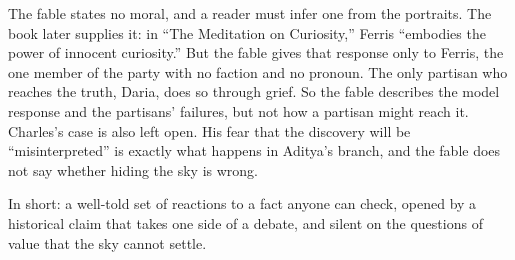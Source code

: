 \begin{afterword}
The fable states no moral, and a reader must infer one from the portraits. The book later supplies it: in ``The Meditation on Curiosity,'' Ferris ``embodies the power of innocent curiosity.'' But the fable gives that response only to Ferris, the one member of the party with no faction and no pronoun. The only partisan who reaches the truth, Daria, does so through grief. So the fable describes the model response and the partisans' failures, but not how a partisan might reach it. Charles's case is also left open. His fear that the discovery will be ``misinterpreted'' is exactly what happens in Aditya's branch, and the fable does not say whether hiding the sky is wrong.

In short: a well-told set of reactions to a fact anyone can check, opened by a historical claim that takes one side of a debate, and silent on the questions of value that the sky cannot settle.
\end{afterword}
